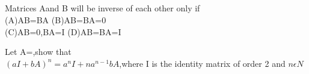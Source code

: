   \item{}\\
  \item {}\\
  \item{}\\
  \item{}\\
  \item{}\\
  \item {}\\
  \item {}\\
  \item {}\\
  \item {}\\
  \item {}\\
  \item {}\\
  \item {}\\
  \item {}\\
  \item {}\\
  
  \item Matrices Aand B will be inverse of each other only if\\
  (A)AB=BA (B)AB=BA=0\\
  (C)AB=0,BA=I (D)AB=BA=I\\
  
  \item Let A=,show that \\$(aI+bA)^{n}=a^{n}I+na^{n-1}bA$,where I is the identity matrix of order 2 and $n \epsilon N$\\

